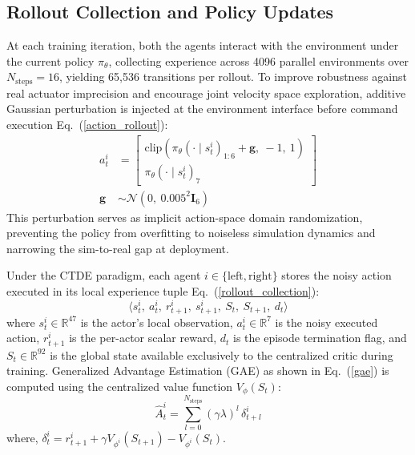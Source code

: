 \documentclass[a4paper,fleqn]{cas-dc}
\begin{document}
\subsection{Rollout Collection and Policy Updates}
\label{rollout_collection_policy_updates}
At each training iteration, both the agents interact with the environment under the current policy $\pi_\theta$, collecting experience across 4096 parallel environments over $N_{\text{steps}} = 16$, yielding 65,536 transitions per rollout. To improve robustness against real actuator imprecision and encourage joint velocity space exploration, additive Gaussian perturbation is injected at the environment interface before command execution Eq.~(\ref{action_rollout}):
\begin{equation}
\begin{aligned}
a_t^i &=
\left[
\begin{array}{c}
\mathrm{clip}\left( \pi_{\theta}(\cdot \mid s_t^i)_{1:6} + \mathbf{g},\ -1,\ 1 \right) \\
\pi_{\theta}(\cdot \mid s_t^i)_{7}
\end{array}
\right] \\
\mathbf{g} &\sim \mathcal{N}\left(0,\ 0.005^2 \mathbf{I}_6\right)
\end{aligned}
\label{action_rollout}
\end{equation}
This perturbation serves as implicit action-space domain randomization, preventing the policy from overfitting to noiseless simulation dynamics and narrowing the sim-to-real gap at deployment.

Under the CTDE paradigm, each agent $i \in \{\text{left}, \text{right}\}$ stores the noisy action executed in its local experience tuple Eq.~(\ref{rollout_collection}):
\begin{equation}
\langle s_t^i,\ a_t^i,\ r_{t+1}^i,\ s_{t+1}^i,\ S_t,\ S_{t+1},\ d_t \rangle
\label{rollout_collection}
\end{equation}
where $s_t^i \in \mathbb{R}^{47}$ is the actor's local observation, $a_t^i \in \mathbb{R}^7$ is the noisy executed action, $r_{t+1}^i$ is the per-actor scalar reward, $d_t$ is the episode termination flag, and $S_t \in \mathbb{R}^{92}$ is the global state available exclusively to the centralized critic during training.
\noindent Generalized Advantage Estimation (GAE) as shown in Eq.~(\ref{gae}) is computed using the centralized value function $V_\phi(S_t)$:
\begin{equation}
\hat{A}^{i}_t = \sum_{l=0}^{N_{\text{steps}}} (\gamma \lambda)^l \, \delta^{i}_{t+l}
\label{gae}
\end{equation}
where, $\delta_t^i = r_{t+1}^i + \gamma V_{\phi^{i}}(S_{t+1}) - V_{\phi^{i}}(S_t)$.
\end{document}
